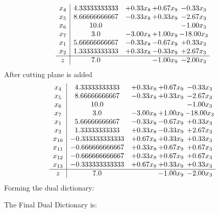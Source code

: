 \documentclass[8pt]{article}
\begin{document}
\[\begin{array}{c| c c@{\hskip 2pt} c@{\hskip 2pt} c@{\hskip 2pt} }
 x_{4}   &  4.33333333333 & +  0.33 x_{8} & +  0.67 x_{9} & -0.33 x_{3}\\
 x_{5}   &  8.66666666667 & -0.33 x_{8} & +  0.33 x_{9} & -2.67 x_{3}\\
 x_{6}   &  10.0  &    &   & -1.00 x_{3}\\
 x_{7}   &  3.0 & -3.00 x_{8} & +  1.00 x_{9} & -18.00 x_{3}\\
 x_{1}   &  5.66666666667 & -0.33 x_{8} & -0.67 x_{9} & +  0.33 x_{3}\\
 x_{2}   &  1.33333333333 & +  0.33 x_{8} & -0.33 x_{9} & +  2.67 x_{3}\\
\hline
z    &  7.0  &   & -1.00 x_{9} & -2.00 x_{3}\\
\end{array}\]
 After cutting plane is added 
\[\begin{array}{c| c c@{\hskip 2pt} c@{\hskip 2pt} c@{\hskip 2pt} }
 x_{4}   &  4.33333333333 & +  0.33 x_{8} & +  0.67 x_{9} & -0.33 x_{3}\\
 x_{5}   &  8.66666666667 & -0.33 x_{8} & +  0.33 x_{9} & -2.67 x_{3}\\
 x_{6}   &  10.0  &    &   & -1.00 x_{3}\\
 x_{7}   &  3.0 & -3.00 x_{8} & +  1.00 x_{9} & -18.00 x_{3}\\
 x_{1}   &  5.66666666667 & -0.33 x_{8} & -0.67 x_{9} & +  0.33 x_{3}\\
 x_{2}   &  1.33333333333 & +  0.33 x_{8} & -0.33 x_{9} & +  2.67 x_{3}\\
 x_{10}   &  -0.333333333333 & +  0.67 x_{8} & +  0.33 x_{9} & +  0.33 x_{3}\\
 x_{11}   &  -0.666666666667 & +  0.33 x_{8} & +  0.67 x_{9} & +  0.67 x_{3}\\
 x_{12}   &  -0.666666666667 & +  0.33 x_{8} & +  0.67 x_{9} & +  0.67 x_{3}\\
 x_{13}   &  -0.333333333333 & +  0.67 x_{8} & +  0.33 x_{9} & +  0.33 x_{3}\\
\hline
z    &  7.0  &   & -1.00 x_{9} & -2.00 x_{3}\\
\end{array}\]
Forming the dual dictionary:

The Final Dual Dictionary is: 
\end{document}
